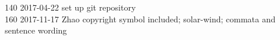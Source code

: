 \begin{footnotesize}
140	2017-04-22	set up git repository\\
160	2017-11-17	Zhao copyright symbol included; solar-wind; commata and sentence wording\\

\end{footnotesize}
